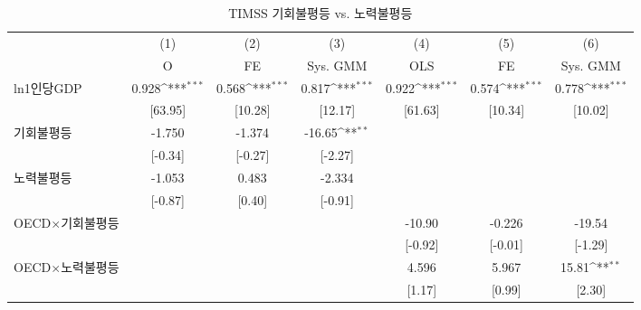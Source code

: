 \begin{table}[htbp]\centering
\def\sym#1{\ifmmode^{#1}\else\(^{#1}\)\fi}
\caption{TIMSS 기회불평등 vs. 노력불평등\label{tab:timsscomp}}
\begin{tabular}{l*{6}{c}}
\toprule
                    &\multicolumn{1}{c}{(1)}&\multicolumn{1}{c}{(2)}&\multicolumn{1}{c}{(3)}&\multicolumn{1}{c}{(4)}&\multicolumn{1}{c}{(5)}&\multicolumn{1}{c}{(6)}\\
                    &\multicolumn{1}{c}{O}&\multicolumn{1}{c}{FE}&\multicolumn{1}{c}{Sys. GMM}&\multicolumn{1}{c}{OLS}&\multicolumn{1}{c}{FE}&\multicolumn{1}{c}{Sys. GMM}\\
\midrule
ln1인당GDP        &       0.928\sym{***}&       0.568\sym{***}&       0.817\sym{***}&       0.922\sym{***}&       0.574\sym{***}&       0.778\sym{***}\\
                    &     [63.95]         &     [10.28]         &     [12.17]         &     [61.63]         &     [10.34]         &     [10.02]         \\
\addlinespace
기회불평등        &      -1.750         &      -1.374         &      -16.65\sym{**} &                     &                     &                     \\
                    &     [-0.34]         &     [-0.27]         &     [-2.27]         &                     &                     &                     \\
\addlinespace
노력불평등        &      -1.053         &       0.483         &      -2.334         &                     &                     &                     \\
                    &     [-0.87]         &      [0.40]         &     [-0.91]         &                     &                     &                     \\
\addlinespace
OECD$\times$기회불평등&                     &                     &                     &      -10.90         &      -0.226         &      -19.54         \\
                    &                     &                     &                     &     [-0.92]         &     [-0.01]         &     [-1.29]         \\
\addlinespace
OECD$\times$노력불평등&                     &                     &                     &       4.596         &       5.967         &       15.81\sym{**} \\
                    &                     &                     &                     &      [1.17]         &      [0.99]         &      [2.30]         \\

\end{tabular}
\end{table}
